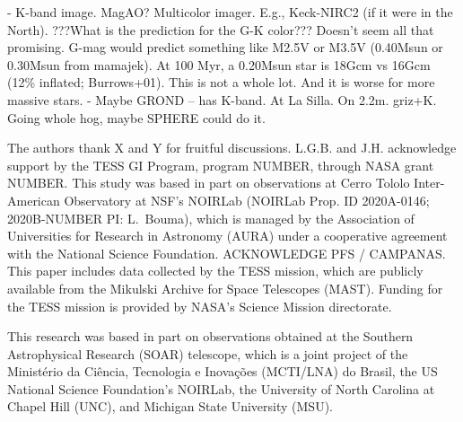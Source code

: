 \documentclass[12pt,twocolumn,tighten]{aastex63}
\begin{document}
- K-band image. MagAO? Multicolor imager.
  E.g., Keck-NIRC2 (if it were in the North).
  ???What is the prediction for the G-K color???
  Doesn't seem all that promising. G-mag would predict something like
  M2.5V or M3.5V (0.40Msun or 0.30Msun from mamajek).
  At 100 Myr, a 0.20Msun star is 18Gcm vs 16Gcm (12\% inflated;
  Burrows+01). This is not a whole lot. And it is worse for more massive
  stars.
- Maybe GROND -- has K-band. At La Silla. On 2.2m.  griz+K.
  Going whole hog, maybe SPHERE could do it.




\acknowledgements
\raggedbottom

The authors thank X and Y for fruitful discussions.
%
L.G.B. and J.H. acknowledge support by the TESS GI Program, program
NUMBER, through NASA grant NUMBER.
%
This study was based in part on observations at Cerro Tololo
Inter-American Observatory at NSF's NOIRLab (NOIRLab Prop. ID
2020A-0146; 2020B-NUMBER PI: L{.}~Bouma), which is managed by the
Association of Universities for Research in Astronomy (AURA) under a
cooperative agreement with the National Science Foundation.
%
ACKNOWLEDGE PFS / CAMPANAS.
%
This paper includes data collected by the TESS mission, which are
publicly available from the Mikulski Archive for Space Telescopes
(MAST).
%
Funding for the TESS mission is provided by NASA's Science Mission
directorate.
%

%
%

This research was based in part on observations obtained at the
Southern Astrophysical Research (SOAR) telescope, which is a joint
project of the Minist\'{e}rio da Ci\^{e}ncia, Tecnologia e
Inova\c{c}\~{o}es (MCTI/LNA) do Brasil, the US National Science
Foundation's NOIRLab, the University of North Carolina at Chapel Hill
(UNC), and Michigan State University (MSU).
\end{document}
